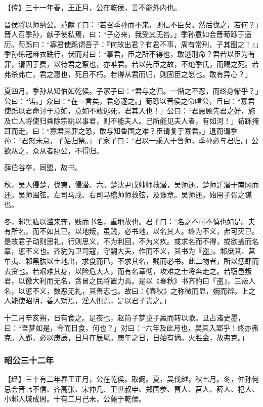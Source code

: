 \documentclass[]{article}
\begin{document}
【传】三十一年春，王正月，公在乾侯，言不能外内也。

晋侯将以师纳公。范献子曰：``若召季孙而不来，则信不臣矣。然后伐之，若何？」晋人召季孙，献子使私焉，曰：``子必来，我受其无咎。」季孙意如会晋荀跞于适历。荀跞曰：``寡君使跞谓吾子：『何故出君？有君不事，周有常刑，子其图之！』」季孙练冠麻衣跣行，伏而对曰：``事君，臣之所不得也，敢逃刑命？君若以臣为有罪，请囚于费，以待君之察也，亦唯君。若以先臣之故，不绝季氏，而赐之死。若弗杀弗亡，君之惠也，死且不朽。若得从君而归，则固臣之愿也。敢有异心？」

夏四月，季孙从知伯如乾侯。子家子曰：``君与之归。一惭之不忍，而终身惭乎？」公曰：``诺。」众曰：``在一言矣，君必逐之。」荀跞以晋侯之命唁公，且曰：``寡君使跞以君命讨于意如，意如不敢逃死，君其入也！」公曰：``君惠顾先君之好，施及亡人将使归粪除宗祧以事君，则不能夫人。己所能见夫人者，有如河！」荀跞掩耳而走，曰：``寡君其罪之恐，敢与知鲁国之难？臣请复于寡君。」退而谓季孙：``君怒未怠，子姑归祭。」子家子曰：``君以一乘入于鲁师，季孙必与君归。」公欲从之，众从者胁公，不得归。

薛伯谷卒，同盟，故书。

秋，吴人侵楚，伐夷，侵潜、六。楚沈尹戌帅师救潜，吴师还。楚师迁潜于南冈而还。吴师围弦。左司马戌、右司马稽帅师救弦，及豫章。吴师还。始用子胥之谋也。

冬，邾黑肱以滥来奔，贱而书名，重地故也。君子曰：``名之不可不慎也如是。夫有所名，而不如其已。以地叛，虽贱，必书地，以名其人。终为不义，弗可灭已。是故君子动则思礼，行则思义，不为利回，不为义疚。或求名而不得，或欲盖而名章，惩不义也。齐豹为卫司寇，守嗣大夫，作而不义，其书为『盗』。邾庶其、莒牟夷、邾黑肱以土地出，求食而已，不求其名，贱而必书。此二物者，所以惩肆而去贪也。若艰难其身，以险危大人，而有名章彻，攻难之士将奔走之。若窃邑叛君，以徼大利而无名，贪冒之民将置力焉。是以《春秋》书齐豹曰『盗』，三叛人名，以惩不义，数恶无礼，其善志也。故曰：《春秋》之称微而显，婉而辨。上之人能使昭明，善人劝焉，淫人惧焉，是以君子贵之。」

十二月辛亥朔，日有食之。是夜也，赵简子梦童子羸而转以歌。旦占诸史墨，曰：``吾梦如是，今而日食，何也？」对曰：``六年及此月也，吴其入郢乎！终亦弗克。入郢，必以庚辰，日月在辰尾。庚午之日，日始有谪。火胜金，故弗克。」

\hypertarget{header-n2861}{%
\subsubsection{昭公三十二年}\label{header-n2861}}

【经】三十有二年春王正月，公在乾侯。取阚。夏，吴伐越。秋七月。冬，仲孙何忌会晋韩不信、齐高张、宋仲几、卫世叔申、郑国参、曹人、莒人、薛人、杞人、小邾人城成周。十有二月己未，公薨于乾侯。
\end{document}
